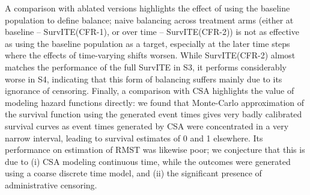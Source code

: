 \documentclass{article}
\begin{document}
A comparison with ablated versions highlights the effect of using the baseline population to define balance; naive balancing across treatment arms (either at baseline -- SurvITE(CFR-1), or over time -- SurvITE(CFR-2)) is not as effective as using the baseline population as a target, especially at the later time steps where the effects of time-varying shifts worsen. While SurvITE(CFR-2) almost matches the performance of the full SurvITE in S3, it performs considerably worse in S4, indicating that this form of balancing suffers mainly due to its ignorance of censoring.  Finally, a comparison with CSA highlights the value of modeling hazard functions directly: we found that Monte-Carlo approximation of the survival function using the generated event times gives very badly calibrated survival curves as event times generated by CSA were concentrated in a very narrow interval, leading to survival estimates of 0 and 1 elsewhere. Its performance on estimation of RMST was likewise poor; we conjecture that this is due to (i) CSA modeling continuous time, while the outcomes were generated using a coarse discrete time model, and (ii) the significant presence of administrative censoring.
\end{document}
